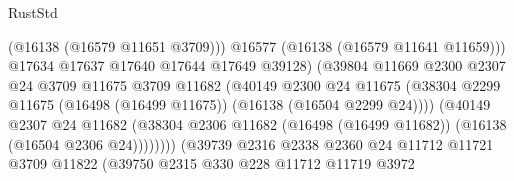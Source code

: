 \begin{lexlean}{RustStd}
\begin{coremodule}
                                              (@16138 (@16579 @11651 @3709)))
                                            @16577
                                            (@16138 (@16579 @11641 @11659)))
                                          @17634
                                          @17637
                                          @17640
                                          @17644
                                          @17649
                                          @39128)
                                        (@39804
                                          @11669
                                          @2300
                                          @2307
                                          @24
                                          @3709
                                          @11675
                                          @3709
                                          @11682
                                          (@40149
                                            @2300
                                            @24
                                            @11675
                                            (@38304
                                              @2299
                                              @11675
                                              (@16498 (@16499 @11675))
                                              (@16138 (@16504 @2299 @24))))
                                          (@40149
                                            @2307
                                            @24
                                            @11682
                                            (@38304
                                              @2306
                                              @11682
                                              (@16498 (@16499 @11682))
                                              (@16138 (@16504 @2306 @24))))))))
                                  (@39739
                                    @2316
                                    @2338
                                    @2360
                                    @24
                                    @11712
                                    @11721
                                    @3709
                                    @11822
                                    (@39750
                                      @2315
                                      @330
                                      @228
                                      @11712
                                      @11719
                                      @3972

\end{coremodule}
\end{lexlean}
